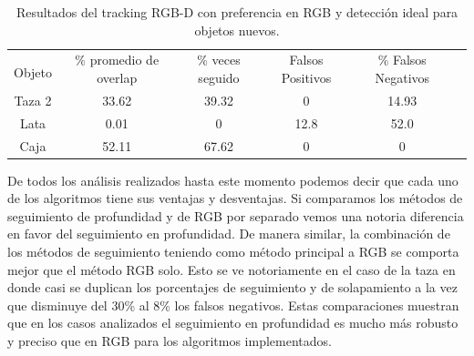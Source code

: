\begin{table}[h]
	\centering
    \begin{tabular}{|c|c|c|c|c|c|}
    \hline
    & \multirow{2}{2.4cm}{\% promedio de overlap} & \multirow{2}{2cm}{\% veces seguido} & \multirow{2}{1.6cm}{Falsos Positivos} & \multirow{2}{1.6cm}{\% Falsos Negativos}\\
	Objeto & & & &\\
    \hline
    Taza 2  & 33.62      & 39.32      & 0       & 14.93\\
    \hline
    Lata    &  0.01      &     0      & 12.8    &  52.0\\
    \hline
    Caja    & 52.11      & 67.62      & 0       &     0\\
    \hline
    \end{tabular}
\caption{Resultados del tracking RGB-D con preferencia en RGB y detección ideal para objetos nuevos.}
\label{tabla_rgbd_rgb_nuevos}
\end{table}


%
%
%
%
%

De todos los análisis realizados hasta este momento podemos decir que cada uno de los algoritmos tiene sus ventajas y desventajas. Si comparamos los métodos de seguimiento de profundidad y de RGB por separado vemos una notoria diferencia en favor del seguimiento en profundidad. De manera similar, la combinación de los métodos de seguimiento teniendo como método principal a RGB se comporta mejor que el método RGB solo. Esto se ve notoriamente en el caso de la taza en donde casi se duplican los porcentajes de seguimiento y de solapamiento a la vez que disminuye del 30\% al 8\% los falsos negativos. Estas comparaciones muestran que en los casos analizados el seguimiento en profundidad es mucho más robusto y preciso que en RGB para los algoritmos implementados.

